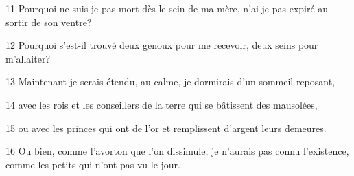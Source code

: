 
11 Pourquoi ne suis-je pas mort dès le sein de ma mère, n’ai-je pas expiré au sortir de son ventre?

12 Pourquoi s’est-il trouvé deux genoux pour me recevoir, deux seins pour m’allaiter?

13 Maintenant je serais étendu, au calme, je dormirais d’un sommeil reposant,

14 avec les rois et les conseillers de la terre qui se bâtissent des mausolées,

15 ou avec les princes qui ont de l’or et remplissent d’argent leurs demeures.

16 Ou bien, comme l’avorton que l’on dissimule, je n’aurais pas connu l’existence, comme les petits qui n’ont pas vu le jour.